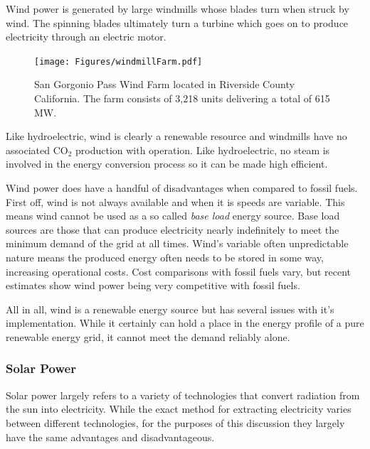 		Wind power is generated by large windmills whose blades turn when struck by wind. The spinning blades ultimately turn a turbine which goes on to produce electricity  through an electric motor. 
		
		\begin{figure}[h!]
			\centering
			\texttt{[image: Figures/windmillFarm.pdf]}
			\caption[San Gorgonio Pass Wind Farm]{San Gorgonio Pass Wind Farm located in Riverside County California. The farm consists of 3,218 units delivering a total of 615 MW. \cite{noauthor_awea_2010, Image_WindFarm} }
		\end{figure}
	
		Like hydroelectric, wind is clearly a renewable resource and windmills have no associated CO$_2$ production with operation. \cite{bickel_externe:_2005} Like hydroelectric, no steam is involved in the energy conversion process so it can be made high efficient. \cite{freidberg_plasma_2007}
		
		Wind power does have a handful of disadvantages when compared to fossil fuels. First off, wind is not always available and when it is speeds are variable. This means wind cannot be used as a so called \emph{base load} energy source.\cite{international_energy_agency_variability} Base load sources are those that can produce electricity nearly indefinitely to meet the minimum demand of the grid at all times. \cite{freidberg_plasma_2007} Wind's variable often unpredictable nature means the produced energy often needs to be stored in some way, increasing operational costs. \cite{armaroli_towards_2011} Cost comparisons with fossil fuels vary, but recent estimates show wind power being very competitive with fossil fuels. \cite{eia_lcoe_2020}
		
		All in all, wind is a renewable energy source but has several issues with it's implementation. While it certainly can hold a place in the energy profile of a pure renewable energy grid, it cannot meet the demand reliably alone.
		
	
	\subsubsection{Solar Power}
	
		Solar power largely refers to a variety of technologies that convert radiation from the sun into electricity. \cite{bibid} While the exact method for extracting electricity varies between different technologies, for the purposes of this discussion they largely have the same advantages and disadvantageous.
		
